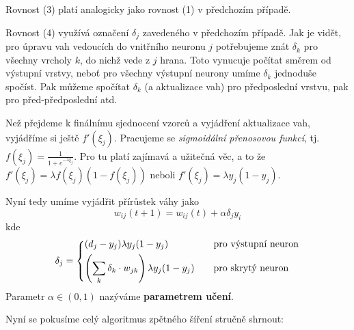 \documentclass[11pt]{report} %
\numberwithin{equation}{section}
\begin{document}
Rovnost (3) platí analogicky jako rovnost (1) v předchozím případě.

Rovnost (4) využívá označení $\delta_j$ zavedeného v předchozím případě. Jak je vidět, pro úpravu vah vedoucích do vnitřního neuronu $j$ potřebujeme znát $\delta_k$ pro všechny vrcholy $k$, do nichž vede z $j$ hrana. Toto vynucuje počítat směrem od výstupní vrstvy, neboť pro všechny výstupní neurony umíme $\delta_k$ jednoduše spočíst. Pak můžeme spočítat $\delta_k$ (a aktualizace vah) pro předposlední vrstvu, pak pro před-předposlední atd.

Než přejdeme k finálnímu sjednocení vzorců a vyjádření aktualizace vah, vyjádříme si ještě $f'(\xi_j)$. Pracujeme se \textit{sigmoidální přenosovou funkcí}, tj. $f(\xi_j) = \frac{1}{1 + e^{-\lambda\xi_j}}$. Pro tu platí zajímavá a užitečná věc, a to že $f'(\xi_j) = \lambda f(\xi_j)(1 - f(\xi_j))$ neboli $f'(\xi_j) = \lambda y_j(1 - y_j)$.

Nyní tedy umíme vyjádřit přírůstek váhy jako
$$
w_{ij}(t+1) = w_{ij}(t) + \alpha\delta_jy_i
$$
kde
$$
\delta_j =
\begin{dcases*}
(d_j - y_j)\lambda y_j (1-y_j) 	& \quad pro výstupní neuron\\
\left(\sum\limits_k \delta_k\cdot w_{jk} \right) \lambda y_j (1-y_j)  	& \quad pro skrytý neuron\\
\end{dcases*}
$$
Parametr $\alpha \in (0,1)$ nazýváme \textbf{parametrem učení}.

Nyní se pokusíme celý algoritmus zpětného šíření stručně shrnout:
\end{document}

